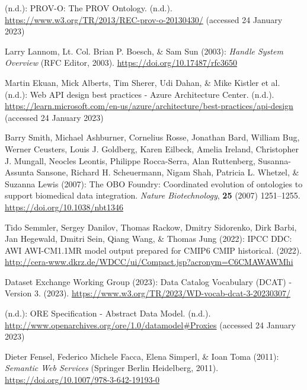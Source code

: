 \begin{thebibliography}{9}
(n.d.): {PROV-O}: {The PROV Ontology}. (n.d.).
\url{https://www.w3.org/TR/2013/REC-prov-o-20130430/} (accessed 24
January 2023)

Larry Lannom, Lt. Col. Brian P. Boesch, \& Sam Sun (2003): \emph{Handle
{System Overview}} ({RFC Editor}, 2003).
\url{https://doi.org/10.17487/rfc3650}

Martin Ekuan, Mick Alberts, Tim Sherer, Udi Dahan, \& Mike Kistler et
al. (n.d.): Web {API} design best practices - {Azure Architecture
Center}. (n.d.).
\url{https://learn.microsoft.com/en-us/azure/architecture/best-practices/api-design}
(accessed 24 January 2023)

Barry Smith, Michael Ashburner, Cornelius Rosse, Jonathan Bard, William
Bug, Werner Ceusters, Louis J. Goldberg, Karen Eilbeck, Amelia Ireland,
Christopher J. Mungall, Neocles Leontis, Philippe Rocca-Serra, Alan
Ruttenberg, Susanna-Assunta Sansone, Richard H. Scheuermann, Nigam Shah,
Patricia L. Whetzel, \& Suzanna Lewis (2007): The {OBO Foundry}:
Coordinated evolution of ontologies to support biomedical data
integration. \emph{Nature Biotechnology}, \textbf{25} (2007) 1251--1255.
\url{https://doi.org/10.1038/nbt1346}

Tido Semmler, Sergey Danilov, Thomas Rackow, Dmitry Sidorenko, Dirk
Barbi, Jan Hegewald, Dmitri Sein, Qiang Wang, \& Thomas Jung (2022):
IPCC DDC: AWI AWI-CM1.1MR model output prepared for CMIP6 CMIP
historical. (2022).
\url{http://cera-www.dkrz.de/WDCC/ui/Compact.jsp?acronym=C6CMAWAWMhi}

Dataset Exchange Working Group (2023): {Data Catalog Vocabulary ({DCAT})
- Version 3}. (2023).
\url{https://www.w3.org/TR/2023/WD-vocab-dcat-3-20230307/}

(n.d.): {ORE Specification} - {Abstract Data Model}. (n.d.).
\url{http://www.openarchives.org/ore/1.0/datamodel\#Proxies} (accessed
24 January 2023)

Dieter Fensel, Federico Michele Facca, Elena Simperl, \& Ioan Toma
(2011): \emph{Semantic {Web Services}} ({Springer Berlin Heidelberg},
2011).
\url{https://doi.org/10.1007/978-3-642-19193-0}


\end{thebibliography}

